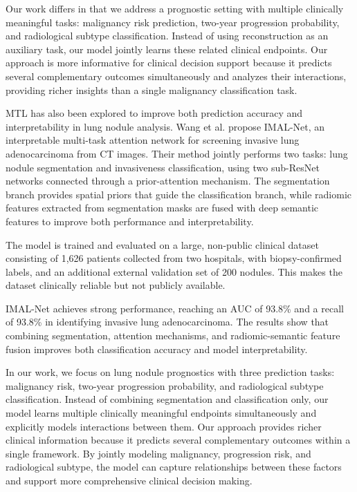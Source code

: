 Our work differs in that we address a prognostic setting with multiple clinically meaningful tasks: malignancy risk prediction, two-year progression probability, and radiological subtype classification. Instead of using reconstruction as an auxiliary task, our model jointly learns these related clinical endpoints. Our approach is more informative for clinical decision support because it predicts several complementary outcomes simultaneously and analyzes their interactions, providing richer insights than a single malignancy classification task.

\vspace{0.5cm}

MTL has also been explored to improve both prediction accuracy and interpretability in lung nodule analysis. Wang et al.\cite{wang2021} propose IMAL-Net, an interpretable multi-task attention network for screening invasive lung adenocarcinoma from CT images. Their method jointly performs two tasks: lung nodule segmentation and invasiveness classification, using two sub-ResNet networks connected through a prior-attention mechanism. The segmentation branch provides spatial priors that guide the classification branch, while radiomic features extracted from segmentation masks are fused with deep semantic features to improve both performance and interpretability.

The model is trained and evaluated on a large, non-public clinical dataset consisting of 1,626 patients collected from two hospitals, with biopsy-confirmed labels, and an additional external validation set of 200 nodules. This makes the dataset clinically reliable but not publicly available.

IMAL-Net achieves strong performance, reaching an AUC of 93.8\% and a recall of 93.8\% in identifying invasive lung adenocarcinoma. The results show that combining segmentation, attention mechanisms, and radiomic-semantic feature fusion improves both classification accuracy and model interpretability.

In our work, we focus on lung nodule prognostics with three prediction tasks: malignancy risk, two-year progression probability, and radiological subtype classification. Instead of combining segmentation and classification only, our model learns multiple clinically meaningful endpoints simultaneously and explicitly models interactions between them. Our approach provides richer clinical information because it predicts several complementary outcomes within a single framework. By jointly modeling malignancy, progression risk, and radiological subtype, the model can capture relationships between these factors and support more comprehensive clinical decision making.

